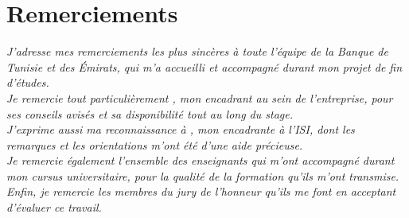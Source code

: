 \chapter*{Remerciements}

\begin{center}
\it \Large
J’adresse mes remerciements les plus sincères à toute l’équipe de la Banque de Tunisie et des Émirats, qui m’a accueilli et accompagné durant mon projet de fin d’études.\\
\vskip12mm
Je remercie tout particulièrement \textbf{\@proFramerName}, mon encadrant au sein de l’entreprise, pour ses conseils avisés et sa disponibilité tout au long du stage.\\
\vskip12mm
J’exprime aussi ma reconnaissance à \textbf{\@academicFramerName}, mon encadrante à l’ISI, dont les remarques et les orientations m’ont été d’une aide précieuse.\\
\vskip12mm
Je remercie également l’ensemble des enseignants qui m’ont accompagné durant mon cursus universitaire, pour la qualité de la formation qu’ils m’ont transmise.\\
\vskip12mm
Enfin, je remercie les membres du jury de l’honneur qu’ils me font en acceptant d’évaluer ce travail.
\end{center}